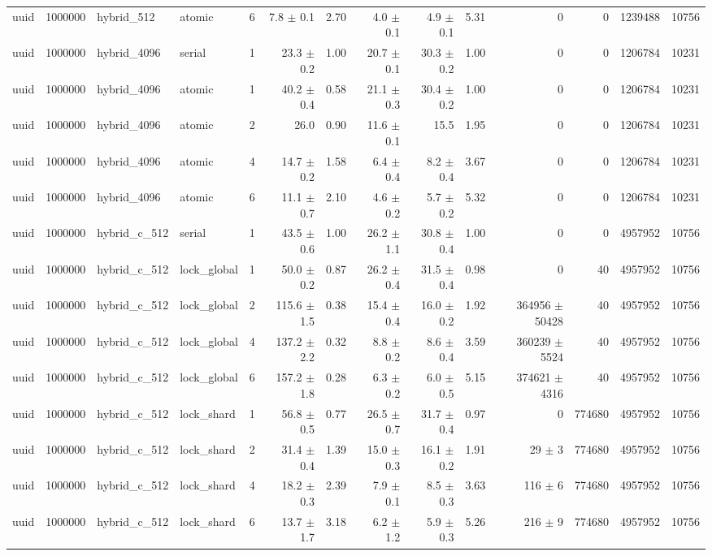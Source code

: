 \begin{tabular}{lllllrrrrrrrrr}
uuid & 1000000 & hybrid\_512 & atomic & 6 & 7.8 $\pm$ 0.1 & 2.70 & 4.0 $\pm$ 0.1 & 4.9 $\pm$ 0.1 & 5.31 & 0 & 0 & 1239488 & 10756 \\
uuid & 1000000 & hybrid\_4096 & serial & 1 & 23.3 $\pm$ 0.2 & 1.00 & 20.7 $\pm$ 0.1 & 30.3 $\pm$ 0.2 & 1.00 & 0 & 0 & 1206784 & 10231 \\
uuid & 1000000 & hybrid\_4096 & atomic & 1 & 40.2 $\pm$ 0.4 & 0.58 & 21.1 $\pm$ 0.3 & 30.4 $\pm$ 0.2 & 1.00 & 0 & 0 & 1206784 & 10231 \\
uuid & 1000000 & hybrid\_4096 & atomic & 2 & 26.0 & 0.90 & 11.6 $\pm$ 0.1 & 15.5 & 1.95 & 0 & 0 & 1206784 & 10231 \\
uuid & 1000000 & hybrid\_4096 & atomic & 4 & 14.7 $\pm$ 0.2 & 1.58 & 6.4 $\pm$ 0.4 & 8.2 $\pm$ 0.4 & 3.67 & 0 & 0 & 1206784 & 10231 \\
uuid & 1000000 & hybrid\_4096 & atomic & 6 & 11.1 $\pm$ 0.7 & 2.10 & 4.6 $\pm$ 0.2 & 5.7 $\pm$ 0.2 & 5.32 & 0 & 0 & 1206784 & 10231 \\
uuid & 1000000 & hybrid\_c\_512 & serial & 1 & 43.5 $\pm$ 0.6 & 1.00 & 26.2 $\pm$ 1.1 & 30.8 $\pm$ 0.4 & 1.00 & 0 & 0 & 4957952 & 10756 \\
uuid & 1000000 & hybrid\_c\_512 & lock\_global & 1 & 50.0 $\pm$ 0.2 & 0.87 & 26.2 $\pm$ 0.4 & 31.5 $\pm$ 0.4 & 0.98 & 0 & 40 & 4957952 & 10756 \\
uuid & 1000000 & hybrid\_c\_512 & lock\_global & 2 & 115.6 $\pm$ 1.5 & 0.38 & 15.4 $\pm$ 0.4 & 16.0 $\pm$ 0.2 & 1.92 & 364956 $\pm$ 50428 & 40 & 4957952 & 10756 \\
uuid & 1000000 & hybrid\_c\_512 & lock\_global & 4 & 137.2 $\pm$ 2.2 & 0.32 & 8.8 $\pm$ 0.2 & 8.6 $\pm$ 0.4 & 3.59 & 360239 $\pm$ 5524 & 40 & 4957952 & 10756 \\
uuid & 1000000 & hybrid\_c\_512 & lock\_global & 6 & 157.2 $\pm$ 1.8 & 0.28 & 6.3 $\pm$ 0.2 & 6.0 $\pm$ 0.5 & 5.15 & 374621 $\pm$ 4316 & 40 & 4957952 & 10756 \\
uuid & 1000000 & hybrid\_c\_512 & lock\_shard & 1 & 56.8 $\pm$ 0.5 & 0.77 & 26.5 $\pm$ 0.7 & 31.7 $\pm$ 0.4 & 0.97 & 0 & 774680 & 4957952 & 10756 \\
uuid & 1000000 & hybrid\_c\_512 & lock\_shard & 2 & 31.4 $\pm$ 0.4 & 1.39 & 15.0 $\pm$ 0.3 & 16.1 $\pm$ 0.2 & 1.91 & 29 $\pm$ 3 & 774680 & 4957952 & 10756 \\
uuid & 1000000 & hybrid\_c\_512 & lock\_shard & 4 & 18.2 $\pm$ 0.3 & 2.39 & 7.9 $\pm$ 0.1 & 8.5 $\pm$ 0.3 & 3.63 & 116 $\pm$ 6 & 774680 & 4957952 & 10756 \\
uuid & 1000000 & hybrid\_c\_512 & lock\_shard & 6 & 13.7 $\pm$ 1.7 & 3.18 & 6.2 $\pm$ 1.2 & 5.9 $\pm$ 0.3 & 5.26 & 216 $\pm$ 9 & 774680 & 4957952 & 10756 \\

\end{tabular}
